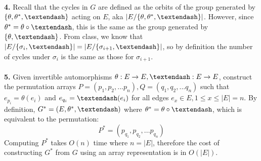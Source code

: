 \documentclass{article}
\begin{document}
\paragraph{} \textbf{4.}
Recall that the cycles in $G$ are defined as the orbits of the group generated by $\{ \theta, \theta^*, \textendash \}$ acting on $E$, aka $|E / \{\theta, \theta^*, \textendash\}|$.  However, since $\theta^* = \theta \circ \textendash$, this is the same as the group generated by $\{ \theta, \textendash \}$.  From class, we know that $|E / \{ \sigma_i , \textendash \}| = |E / \{ \sigma_{i+1}, \textendash \} |$, so by definition the number of cycles under $\sigma_i$ is the same as those for $\sigma_{i+1}$.

\paragraph{} \textbf{5.}
Given invertible automorphisms $\theta : E \rightarrow E, \textendash : E \rightarrow E$, construct the permutation arrays $P = (p_1, p_2, ... p_n), Q = (q_1, q_2, ... q_n)$ such that $e_{p_i} = \theta(e_i)$ and $e_{q_i} = \textendash(e_i)$ for all edges $e_x \in E, 1 \leq x \leq |E| = n$.  By definition, $G^* = (E, \theta^*, \textendash)$ where $\theta^* = \theta \circ \textendash$, which is equivalent to the permutation:
\[ P^* = (p_{q_1}, p_{q_2}, ... p_{q_n}) \]
Computing $P^*$ takes $O(n)$ time where $n = |E|$, therefore the cost of constructing $G^*$ from $G$ using an array representation is in $O(|E|)$.
\end{document}
